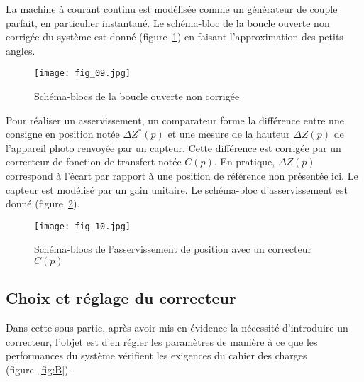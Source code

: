 \ifprof
\else
La machine à courant continu est modélisée comme un générateur de couple parfait, en particulier instantané. Le schéma-bloc de la boucle ouverte non corrigée du système est donné (figure~\ref{fig:09}) en faisant l'approximation des petits angles.

\begin{figure}[H]
\centering
\texttt{[image: fig\_09.jpg]}
\caption{\label{fig:09} Schéma-blocs de la boucle ouverte non corrigée}
\end{figure}


Pour réaliser un asservissement, un comparateur forme la différence entre une consigne en position notée $\Delta Z^{*}(p)$ et une mesure de la hauteur $\Delta Z(p)$ de l'appareil photo renvoyée par un capteur. Cette différence est corrigée par un correcteur de fonction de transfert notée $C(p)$. En pratique, $\Delta Z(p)$ correspond à l'écart par rapport à une position de référence non présentée ici. Le capteur est modélisé par un gain unitaire. Le schéma-bloc d'asservissement est donné (figure~\ref{fig:10}).

\begin{figure}[H]
\centering
\texttt{[image: fig\_10.jpg]}
\caption{\label{fig:10} Schéma-blocs de l'asservissement de position avec un correcteur $C(p)$}
\end{figure}
\fi

\subsection{Choix et réglage du correcteur}
\ifprof
\else
Dans cette sous-partie, après avoir mis en évidence la nécessité d'introduire un correcteur, l'objet est d'en régler les paramètres de manière à ce que les performances du système vérifient les exigences du cahier des charges (figure~\ref{fig:B}).
\fi

